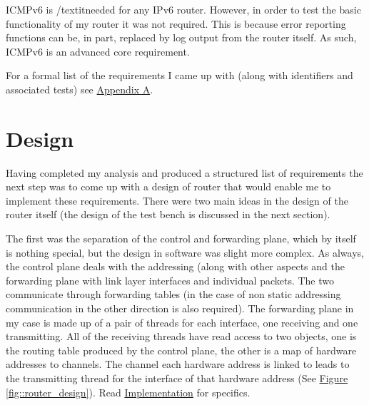 \documentclass[12pt,a4paper,twoside,openright]{report}
\begin{document}
ICMPv6 is /textit{needed} for any IPv6 router.  However, in order to test the basic functionality of my router it was not required. This is because error reporting functions can be, in part, replaced by log output from the router itself. As such, ICMPv6 is an advanced core requirement.

\bigskip

For a formal list of the requirements I came up with (along with identifiers and associated tests) see \hyperref[appendix::requirements]{Appendix A}.

\section{Design}
\label{sec::design}

Having completed my analysis and produced a structured list of requirements the next step was to come up with a design of router that would enable me to implement these requirements.  There were two main ideas in the design of the router itself (the design of the test bench is discussed in the next section). 

\bigskip

The first was the separation of the control and forwarding plane, which by itself is nothing special, but the design in software was slight more complex.  As always, the control plane deals with the addressing (along with other aspects and the forwarding plane with link layer interfaces and individual packets.  The two communicate through forwarding tables (in the case of non static addressing communication in the other direction is also required). The forwarding plane in my case is made up of a pair of threads for each interface, one receiving and one transmitting. All of the receiving threads have read access to two objects, one is the routing table produced by the control plane, the other is a map of hardware addresses to channels.  The channel each hardware address is linked to leads to the transmitting thread for the interface of that hardware address (See \hyperref[fig::router_design]{Figure }\ref{fig::router_design}). Read \hyperref[chap::implementation]{Implementation} for specifics.
\end{document}
